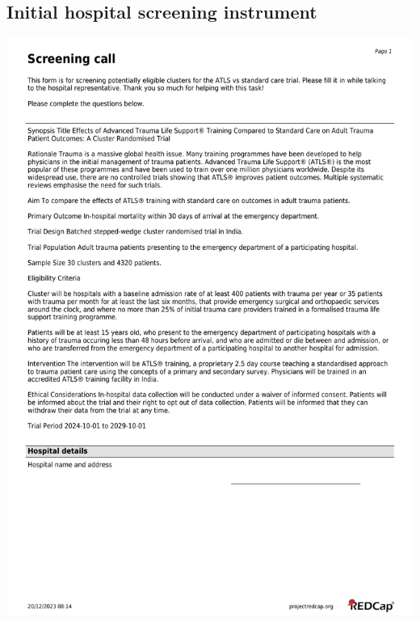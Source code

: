 \documentclass[
]{scrartcl}
\begin{document}
\hypertarget{sec-appendix-hospital-screening-instrument}{%
\subsection{Initial hospital screening
instrument}\label{sec-appendix-hospital-screening-instrument}}

\includegraphics{./appendices/hospital-screening-instrument/hospital-screening-instrument-1.pdf}
\end{document}
